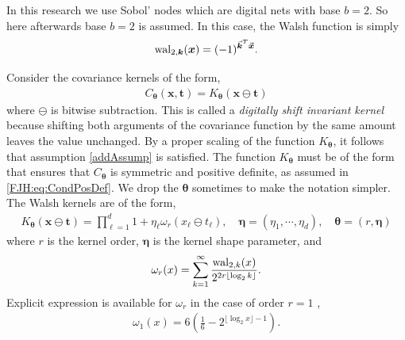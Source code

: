 \documentclass{iitthesis}          %
\newcommand{\bm}[1]{\boldsymbol{#1}}
\newcommand{\veta}{{\bm{\eta}}}
\newcommand{\vtheta}{{\bm{\theta}}}
\newcommand{\vk}{\bm{k}}
\newcommand{\vt}{\bm{t}}
\newcommand{\vx}{\bm{x}}
\newcommand{\JRNote}[1]{}
\begin{document}
In this research we use Sobol' nodes which are digital nets with base $b=2$. So here afterwards base $b=2$ is assumed. %
In this case, the Walsh function is simply $$\textup{wal}_{2,\vk} (\vx) = (-1)^{\vec{\vk}^T \vec{\vx}}.$$

Consider the covariance kernels of the form,
\begin{align}
\label{eqn:digital_shift_in_kernel}
C_{\vtheta}(\vx, \vt) = K_{\vtheta} (\vx \ominus \vt) 
\end{align}
where $\ominus$ is bitwise subtraction.
This is called a \emph{digitally shift invariant kernel} because shifting both arguments of the covariance function by the same amount leaves the value unchanged. By a proper scaling of the function $K_{\vtheta}$, it follows that assumption \eqref{addAssump} is satisfied. The function $K_{\vtheta}$ must be of the form that ensures that $C_{\vtheta}$ is symmetric and positive definite, as assumed in \eqref{FJH:eq:CondPosDef}. We drop the ${\vtheta}$ sometimes to make the notation simpler.
The Walsh kernels are of the form,
\begin{align}
\label{eqn:walsh_kernel}
K_{\vtheta} (\vx \ominus \vt) =  
\prod_{\ell=1}^d  1 + \eta_\ell \omega_{r} (x_\ell \ominus t_\ell), \quad \veta = (\eta_1, \cdots, \eta_d), \quad \vtheta = (r, \veta)
\end{align}
where $r$ is the kernel order, $\veta$ is the kernel shape parameter, and
\begin{align*}
\omega_r(x) = \sum_{k=1}^\infty 
\frac{\textup{wal}_{2,k}(x) }{2^{2r \lfloor \log_2 k \rfloor}}.
\end{align*}
Explicit expression is available for $\omega_{r}$ in the case of order $r=1$ \cite{Nuyens2013}, %
\begin{align}
\label{eqn:omega1}
\omega_1(x) 
 = 6\left( \frac 16 - 2^{\lfloor \log_2 x \rfloor -1 }\right).
\end{align}
\end{document}
